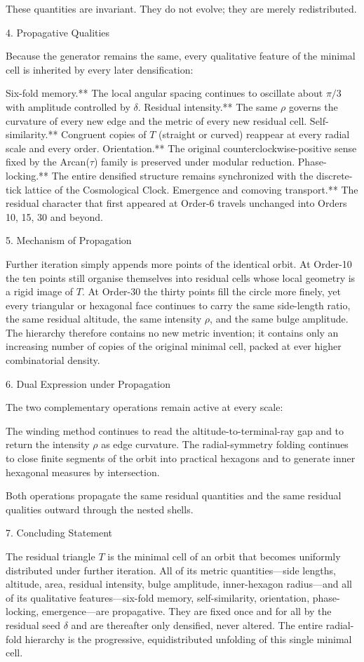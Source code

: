 These quantities are invariant. They do not evolve; they are merely redistributed.

4. Propagative Qualities

Because the generator remains the same, every qualitative feature of the minimal cell is inherited by every later densification:

Six-fold memory.** The local angular spacing continues to oscillate about \(\pi/3\) with amplitude controlled by \(\delta\).  
Residual intensity.** The same \(\rho\) governs the curvature of every new edge and the metric of every new residual cell.  
Self-similarity.** Congruent copies of \(T\) (straight or curved) reappear at every radial scale and every order.  
Orientation.** The original counterclockwise-positive sense fixed by the Arcan(\(\tau\)) family is preserved under modular reduction.  
Phase-locking.** The entire densified structure remains synchronized with the discrete-tick lattice of the Cosmological Clock.  
Emergence and comoving transport.** The residual character that first appeared at Order-6 travels unchanged into Orders 10, 15, 30 and beyond.

5. Mechanism of Propagation

Further iteration simply appends more points of the identical orbit. At Order-10 the ten points still organise themselves into residual cells whose local geometry is a rigid image of \(T\). At Order-30 the thirty points fill the circle more finely, yet every triangular or hexagonal face continues to carry the same side-length ratio, the same residual altitude, the same intensity \(\rho\), and the same bulge amplitude. The hierarchy therefore contains no new metric invention; it contains only an increasing number of copies of the original minimal cell, packed at ever higher combinatorial density.

6. Dual Expression under Propagation

The two complementary operations remain active at every scale:

The winding method continues to read the altitude-to-terminal-ray gap and to return the intensity \(\rho\) as edge curvature.  
The radial-symmetry folding continues to close finite segments of the orbit into practical hexagons and to generate inner hexagonal measures by intersection.

Both operations propagate the same residual quantities and the same residual qualities outward through the nested shells.

7. Concluding Statement

The residual triangle \(T\) is the minimal cell of an orbit that becomes uniformly distributed under further iteration. All of its metric quantities—side lengths, altitude, area, residual intensity, bulge amplitude, inner-hexagon radius—and all of its qualitative features—six-fold memory, self-similarity, orientation, phase-locking, emergence—are propagative. They are fixed once and for all by the residual seed \(\delta\) and are thereafter only densified, never altered. The entire radial-fold hierarchy is the progressive, equidistributed unfolding of this single minimal cell.
